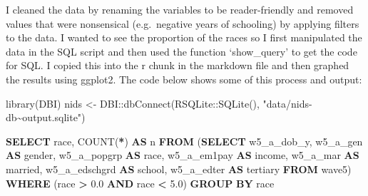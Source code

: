 \documentclass[11pt,preprint, authoryear]{elsarticle}
\numberwithin{equation}{section}
\numberwithin{figure}{section}
\numberwithin{table}{section}
\newenvironment{Shaded}{\begin{snugshade}}{\end{snugshade}}
\newcommand{\FloatTok}[1]{\textcolor[rgb]{0.00,0.00,0.81}{#1}}
\newcommand{\FunctionTok}[1]{\textcolor[rgb]{0.00,0.00,0.00}{#1}}
\newcommand{\KeywordTok}[1]{\textcolor[rgb]{0.13,0.29,0.53}{\textbf{#1}}}
\newcommand{\NormalTok}[1]{#1}
\newcommand{\OperatorTok}[1]{\textcolor[rgb]{0.81,0.36,0.00}{\textbf{#1}}}
\newcommand{\OtherTok}[1]{\textcolor[rgb]{0.56,0.35,0.01}{#1}}
\newcommand{\SpecialCharTok}[1]{\textcolor[rgb]{0.00,0.00,0.00}{#1}}
\newcommand{\StringTok}[1]{\textcolor[rgb]{0.31,0.60,0.02}{#1}}
\begin{document}
I cleaned the data by renaming the variables to be reader-friendly and
removed values that were nonsensical (e.g.~negative years of schooling)
by applying filters to the data. I wanted to see the proportion of the
races so I first manipulated the data in the SQL script and then used
the function `show\_query' to get the code for SQL. I copied this into
the r chunk in the markdown file and then graphed the results using
ggplot2. The code below shows some of this process and output:

\begin{Shaded}
\begin{Highlighting}[]
\FunctionTok{library}\NormalTok{(DBI)}
\NormalTok{nids }\OtherTok{\textless{}{-}}\NormalTok{ DBI}\SpecialCharTok{::}\FunctionTok{dbConnect}\NormalTok{(RSQLite}\SpecialCharTok{::}\FunctionTok{SQLite}\NormalTok{(), }\StringTok{"data/nids{-}db\textasciitilde{}output.sqlite"}\NormalTok{)}
\end{Highlighting}
\end{Shaded}

\begin{Shaded}
\begin{Highlighting}[]
\KeywordTok{SELECT}\NormalTok{ \textasciigrave{}race\textasciigrave{}, }\FunctionTok{COUNT}\NormalTok{(}\OperatorTok{*}\NormalTok{) }\KeywordTok{AS}\NormalTok{ \textasciigrave{}n\textasciigrave{}}
\KeywordTok{FROM}\NormalTok{ (}\KeywordTok{SELECT}\NormalTok{ \textasciigrave{}w5\_a\_dob\_y\textasciigrave{}, \textasciigrave{}w5\_a\_gen\textasciigrave{} }\KeywordTok{AS}\NormalTok{ \textasciigrave{}gender\textasciigrave{}, \textasciigrave{}w5\_a\_popgrp\textasciigrave{} }\KeywordTok{AS}\NormalTok{ \textasciigrave{}race\textasciigrave{}, }
\NormalTok{\textasciigrave{}w5\_a\_em1pay\textasciigrave{} }\KeywordTok{AS}\NormalTok{ \textasciigrave{}income\textasciigrave{}, \textasciigrave{}w5\_a\_mar\textasciigrave{} }\KeywordTok{AS}\NormalTok{ \textasciigrave{}married\textasciigrave{}, \textasciigrave{}w5\_a\_edschgrd\textasciigrave{} }\KeywordTok{AS}\NormalTok{ \textasciigrave{}school\textasciigrave{}, }
\NormalTok{\textasciigrave{}w5\_a\_edter\textasciigrave{} }\KeywordTok{AS}\NormalTok{ \textasciigrave{}tertiary\textasciigrave{} }\KeywordTok{FROM}\NormalTok{ \textasciigrave{}wave5\textasciigrave{}) }\KeywordTok{WHERE}\NormalTok{ (\textasciigrave{}race\textasciigrave{} }\OperatorTok{\textgreater{}} \FloatTok{0.0} \KeywordTok{AND}\NormalTok{ \textasciigrave{}race\textasciigrave{} }\OperatorTok{\textless{}} \FloatTok{5.0}\NormalTok{)}
\KeywordTok{GROUP} \KeywordTok{BY}\NormalTok{ \textasciigrave{}race\textasciigrave{}}
\end{Highlighting}
\end{Shaded}
\end{document}
